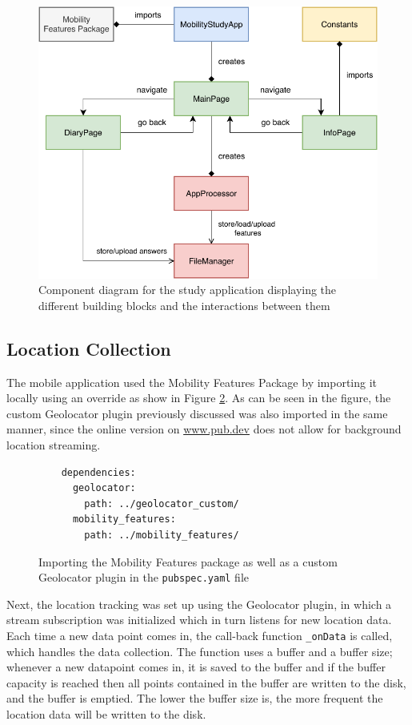 \begin{figure}
    \centering
    \includegraphics[width=\textwidth]{images/diagrams/app-diagram.pdf}
    \caption{Component diagram for the study application displaying the different building blocks and the interactions between them}
    \label{fig:app-component-diagram}
\end{figure}


\subsection{Location Collection}
The mobile application used the Mobility Features Package by importing it locally using an override as show in Figure \ref{fig:import-package}. As can be seen in the figure, the custom Geolocator plugin previously discussed was also imported in the same manner, since the online version on \url{www.pub.dev} does not allow for background location streaming. 

\begin{figure}
    \centering
    \begin{verbatim}
    dependencies:
      geolocator:
        path: ../geolocator_custom/
      mobility_features:
        path: ../mobility_features/
    \end{verbatim}
    \caption{Importing the Mobility Features package as well as a custom Geolocator plugin in the \verb|pubspec.yaml| file}
    \label{fig:import-package}
\end{figure}

Next, the location tracking was set up using the Geolocator plugin, in which a stream subscription was initialized which in turn listens for new location data. Each time a new data point comes in, the call-back function \verb|_onData| is called, which handles the data collection. The function uses a buffer and a buffer size; whenever a new datapoint comes in, it is saved to the buffer and if the buffer capacity is reached then all points contained in the buffer are written to the disk, and the buffer is emptied. The lower the buffer size is, the more frequent the location data will be written to the disk.

